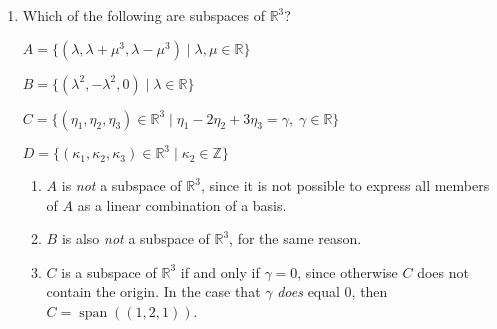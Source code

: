 \documentclass[11pt]{article}
\newcommand{\R}{\mathbb{R}}
\newcommand{\Z}{\mathbb{Z}}
\newcommand{\mat}[1]{\mathbf{#1}}   %
\DeclareMathOperator{\Span}{span}
\theoremstyle{definition}
\theoremstyle{plain}
\theoremstyle{remark}
\begin{document}
\begin{enumerate}
\[\begin{aligned}
                   &
                  \\
                  \rightsquigarrow
                  \begin{bmatrix}
                      \begin{array}{@{\negmedspace}i{3}i{3}i{3}i{3}@{\quad}|@{\quad}i{3}i{3}i{3}i{3}@{\;\;\;}}
                          1 & 0 & 0 & 0 & 0  & -1 & 0 & 1  \\
                          0 & 1 & 0 & 0 & -1 & 0  & 0 & 1  \\
                          0 & 0 & 1 & 0 & 1  & 1  & 0 & -1 \\
                          0 & 0 & 0 & 1 & 1  & 1  & 1 & -2
                      \end{array}
                  \end{bmatrix}
                   & = \begin{bmatrix}
                           \;\mat{I} \;|\; \mat{A}^{-1} \,
                       \end{bmatrix}
              \end{aligned}
          \]

          \pagebreak

    \item[2.9] Which of the following are subspaces of $\R^3$?

          $A = \{ (\lambda, \lambda + \mu^3, \lambda - \mu^3 ) \mid \lambda, \mu \in \R \}$

          $B = \{ (\lambda^2, -\lambda^2, 0) \mid \lambda \in \R \}$

          $C = \{ (\eta_1, \eta_2, \eta_3) \in \R^3 \mid \eta_1 - 2 \eta_2 + 3 \eta_3 = \gamma, \; \gamma \in \R \}$

          $D = \{ (\kappa_1, \kappa_2, \kappa_3) \in \R^3 \mid \kappa_2 \in \Z \}$

          \begin{enumerate}
              \item[a.] $A$ is \emph{not} a subspace of $\R^3$, since it is not possible to express all members of $A$ as a
                    linear combination of a basis.

              \item[b.] $B$ is also \emph{not} a subspace of $\R^3$, for the same reason.

              \item[c.] $C$ is a subspace of $\R^3$ if and only if $\gamma = 0$, since otherwise $C$ does not contain the
                    origin.  In the case that $\gamma$ \emph{does} equal $0$, then $C = \Span((1, 2, 1))$.


\end{enumerate}
\end{enumerate}
\end{document}
